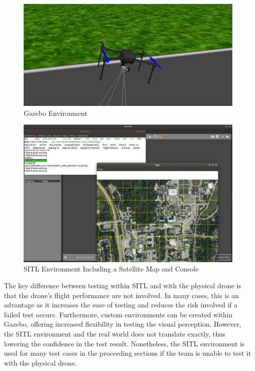 \documentclass[12pt, titlepage]{article}
\begin{document}
\begin{figure}[h!]
  \begin{center} 
  \caption{Gazebo Environment}
  \label{fig:gazebo}
        \includegraphics[width=1\textwidth]{VnVPlan/gazebo.png}
  \end{center}
\end{figure}

\begin{figure}[h!]
  \begin{center} 
  \caption{SITL Environment Including a Satellite Map and Console}
  \label{fig:sitlEnv}
        \includegraphics[width=1\textwidth]{VnVPlan/SITLEnv.png}
  \end{center}
\end{figure}

\clearpage

The key difference between testing within SITL and with the physical drone is that the drone's flight performance are not involved. In many cases, this is an advantage as it increases the ease of testing and reduces the risk involved if a failed test occurs. Furthermore, custom environments can be created within Gazebo, offering increased flexibility in testing the visual perception. However, the SITL environment and the real world does not translate exactly, thus lowering the confidence in the test result. Nonetheless, the SITL environment is used for many test cases in the proceeding sections if the team is unable to test it with the physical drone.
\end{document}
